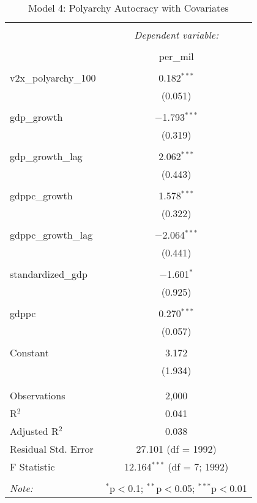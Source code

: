 
\begin{table}[!htbp] \centering 
  \caption{Model 4: Polyarchy Autocracy with Covariates} 
  \label{} 
\begin{tabular}{@{\extracolsep{5pt}}lc} 
\\[-1.8ex]\hline 
\hline \\[-1.8ex] 
 & \multicolumn{1}{c}{\textit{Dependent variable:}} \\ 
\cline{2-2} 
\\[-1.8ex] & per\_mil \\ 
\hline \\[-1.8ex] 
 v2x\_polyarchy\_100 & 0.182$^{***}$ \\ 
  & (0.051) \\ 
  & \\ 
 gdp\_growth & $-$1.793$^{***}$ \\ 
  & (0.319) \\ 
  & \\ 
 gdp\_growth\_lag & 2.062$^{***}$ \\ 
  & (0.443) \\ 
  & \\ 
 gdppc\_growth & 1.578$^{***}$ \\ 
  & (0.322) \\ 
  & \\ 
 gdppc\_growth\_lag & $-$2.064$^{***}$ \\ 
  & (0.441) \\ 
  & \\ 
 standardized\_gdp & $-$1.601$^{*}$ \\ 
  & (0.925) \\ 
  & \\ 
 gdppc & 0.270$^{***}$ \\ 
  & (0.057) \\ 
  & \\ 
 Constant & 3.172 \\ 
  & (1.934) \\ 
  & \\ 
\hline \\[-1.8ex] 
Observations & 2,000 \\ 
R$^{2}$ & 0.041 \\ 
Adjusted R$^{2}$ & 0.038 \\ 
Residual Std. Error & 27.101 (df = 1992) \\ 
F Statistic & 12.164$^{***}$ (df = 7; 1992) \\ 
\hline 
\hline \\[-1.8ex] 
\textit{Note:}  & \multicolumn{1}{r}{$^{*}$p$<$0.1; $^{**}$p$<$0.05; $^{***}$p$<$0.01} \\ 
\end{tabular} 
\end{table} 
